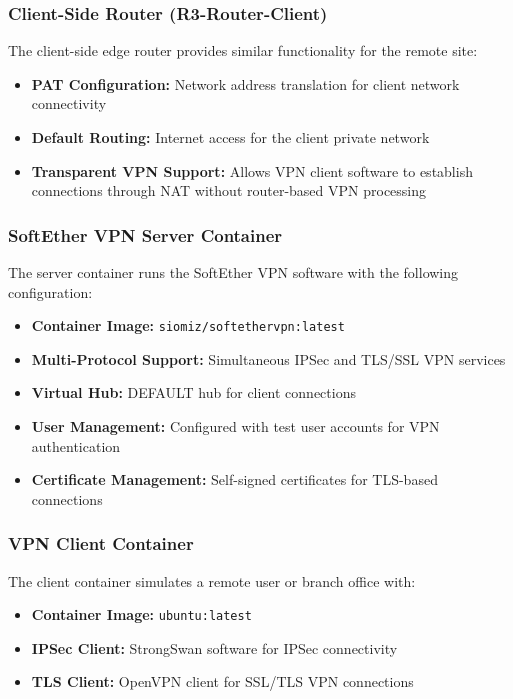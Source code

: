 \subsubsection{Client-Side Router (R3-Router-Client)}

The client-side edge router provides similar functionality for the remote site:

\begin{itemize}
    \item \textbf{PAT Configuration:} Network address translation for client network connectivity
    \item \textbf{Default Routing:} Internet access for the client private network
    \item \textbf{Transparent VPN Support:} Allows VPN client software to establish connections through NAT without router-based VPN processing
\end{itemize}

\subsubsection{SoftEther VPN Server Container}

The server container runs the SoftEther VPN software with the following configuration:

\begin{itemize}
    \item \textbf{Container Image:} \texttt{siomiz/softethervpn:latest}
    \item \textbf{Multi-Protocol Support:} Simultaneous IPSec and TLS/SSL VPN services
    \item \textbf{Virtual Hub:} DEFAULT hub for client connections
    \item \textbf{User Management:} Configured with test user accounts for VPN authentication
    \item \textbf{Certificate Management:} Self-signed certificates for TLS-based connections
\end{itemize}

\subsubsection{VPN Client Container}

The client container simulates a remote user or branch office with:

\begin{itemize}
    \item \textbf{Container Image:} \texttt{ubuntu:latest}
    \item \textbf{IPSec Client:} StrongSwan software for IPSec connectivity
    \item \textbf{TLS Client:} OpenVPN client for SSL/TLS VPN connections
\end{itemize}

